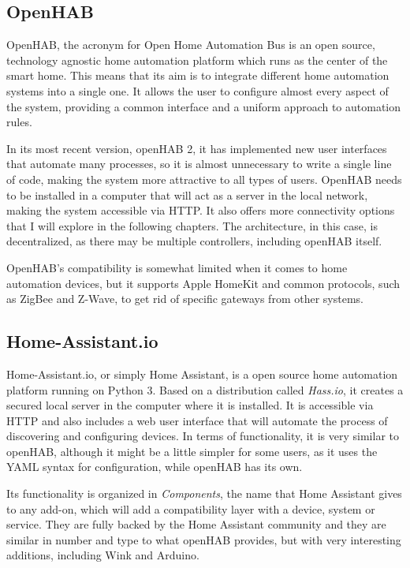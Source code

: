 \subsection{OpenHAB}
OpenHAB, the acronym for Open Home Automation Bus is an open source, technology agnostic home automation platform which runs
as the center of the smart home. \cite{openHABDocs} This means that its aim is to integrate different home automation systems into
a single one. It allows the user to configure almost every aspect of the system, providing a common interface and a uniform approach
to automation rules.

In its most recent version, openHAB 2, it has implemented new user interfaces that automate many processes, so it is almost unnecessary
to write a single line of code, making the system more attractive to all types of users. OpenHAB needs to be installed in a computer that
will act as a server in the local network, making the system accessible via HTTP. It also offers more connectivity options that I will explore
in the following chapters. The architecture, in this case, is decentralized, as there may be multiple controllers, including openHAB itself.

OpenHAB's compatibility is somewhat limited when it comes to home automation devices, but it supports Apple HomeKit and common
protocols, such as ZigBee and Z-Wave, to get rid of specific gateways from other systems.\cite{openHABAddons}

\subsection{Home-Assistant.io}
Home-Assistant.io, or simply Home Assistant, is a open source home automation platform running on Python 3.\cite{homeAssistantio}
Based on a distribution called \textit{Hass.io}, it creates a secured local server in the computer where it is installed. It is accessible via
HTTP and also includes a web user interface that will automate the process of discovering and configuring devices. In terms of
functionality, it is very similar to openHAB, although it might be a little simpler for some users, as it uses the YAML syntax for
configuration, while openHAB has its own.

Its functionality is organized in \textit{Components}, the name that Home Assistant gives to any add-on, which will add a compatibility
layer with a device, system or service. They are fully backed by the Home Assistant community and they are similar in number and type to
what openHAB provides, but with very interesting additions, including Wink and Arduino.

